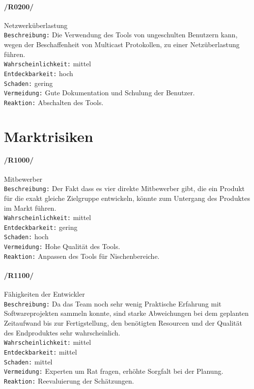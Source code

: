 \paragraph{/R0200/}Netzwerküberlastung\\
\texttt{Beschreibung:} Die Verwendung des Tools von ungeschulten Benutzern kann, wegen der Beschaffenheit von Multicast Protokollen, zu einer Netzüberlastung führen. \\
\texttt{Wahrscheinlichkeit:} mittel\\
\texttt{Entdeckbarkeit:} hoch\\
\texttt{Schaden:} gering\\
\texttt{Vermeidung:} Gute Dokumentation und Schulung der Benutzer.\\
\texttt{Reaktion:} Abschalten des Tools.\\

\section{Marktrisiken}
\label{sec:marketrisk}

\paragraph{/R1000/}Mitbewerber\\ 
\texttt{Beschreibung:} Der Fakt dass es vier direkte Mitbewerber gibt, die ein
Produkt für die exakt gleiche Zielgruppe entwickeln, könnte zum Untergang des
Produktes im Markt führen. \\ \texttt{Wahrscheinlichkeit:} mittel\\ \texttt{Entdeckbarkeit:} gering\\
\texttt{Schaden:} hoch\\
\texttt{Vermeidung:} Hohe Qualität des Tools.\\
\texttt{Reaktion:} Anpassen des Tools für Nischenbereiche.\\

\paragraph{/R1100/}Fähigkeiten der Entwickler\\
\texttt{Beschreibung:} Da das Team noch sehr wenig Praktische Erfahrung mit
Softwareprojekten sammeln konnte, sind starke Abweichungen bei dem geplanten Zeitaufwand bis zur Fertigstellung, den benötigten Resourcen und der Qualität des Endproduktes sehr wahrscheinlich. \\ 
\texttt{Wahrscheinlichkeit:} mittel\\
\texttt{Entdeckbarkeit:} mittel\\
\texttt{Schaden:} mittel\\
\texttt{Vermeidung:} Experten um Rat fragen, erhöhte Sorgfalt bei der Planung.\\
\texttt{Reaktion:} Reevaluierung der Schätzungen.\\
 
